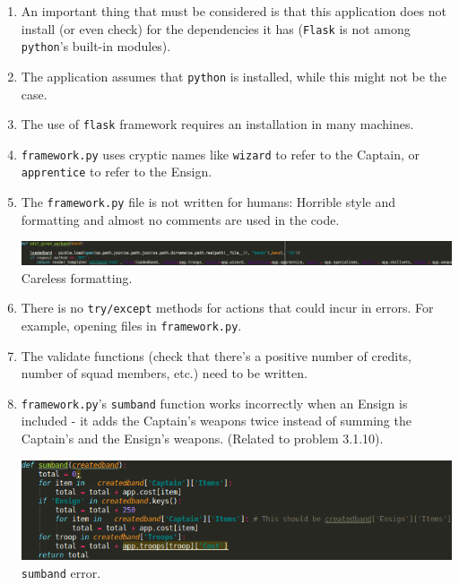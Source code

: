 \documentclass[12pt,a4paper]{article}
\begin{document}
\begin{enumerate}
 \item An important thing that must be considered is that this application does not install (or even check) for the dependencies it has (\texttt{Flask} is not among \texttt{python}'s built-in modules).
 \item The application assumes that \texttt{python} is installed, while this might not be the case. 
 \item The use of \texttt{flask} framework requires an installation in many machines.
 \item \texttt{framework.py} uses cryptic names like \texttt{wizard} to refer to the Captain, or \texttt{apprentice} to refer to the Ensign.
 \item The \texttt{framework.py} file is not written for humans: Horrible style and formatting and almost no comments are used in the code.\\
 \begin{minipage}[t]{\linewidth}
 \centering
 \includegraphics[width=1\textwidth]{img/formatting}
 Careless formatting.
 \end{minipage}
 
 \item There is no \texttt{try/except} methods for actions that could incur in errors. For example, opening files in \texttt{framework.py}.
 \item The validate functions (check that there's a positive number of credits, number of squad members, etc.) need to be written. 
 
 \item \texttt{framework.py}'s \texttt{sumband} function works incorrectly when an Ensign is included - it adds the Captain's weapons twice instead of summing the Captain's and the Ensign's weapons. (Related to problem 3.1.10).\\
 \begin{minipage}[t]{\linewidth}
 \centering
 \includegraphics[width=1\textwidth]{img/sumband}
 \texttt{sumband} error.
 \end{minipage}
 

\end{enumerate}
\end{document}
